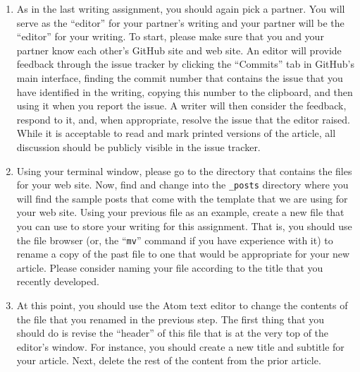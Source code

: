 \begin{enumerate}

  \itemsep 0em

  \item As in the last writing assignment, you should again pick a partner. You will serve as the ``editor'' for your
    partner's writing and your partner will be the ``editor'' for your writing. To start, please make sure that you and
    your partner know each other's GitHub site and web site. An editor will provide feedback through the issue tracker
    by clicking the ``Commits'' tab in GitHub's main interface, finding the commit number that contains the issue that
    you have identified in the writing, copying this number to the clipboard, and then using it when you report the
    issue. A writer will then consider the feedback, respond to it, and, when appropriate, resolve the issue that the
    editor raised. While it is acceptable to read and mark printed versions of the article, all discussion should be
    publicly visible in the issue tracker.

  \item Using your terminal window, please go to the directory that contains the files for your web site. Now, find and
    change into the {\tt \_posts} directory where you will find the sample posts that come with the template that we are
    using for your web site. Using your previous file as an example, create a new file that you can use to store your
    writing for this assignment. That is, you should use the file browser (or, the ``{\tt mv}'' command if you have
    experience with it) to rename a copy of the past file to one that would be appropriate for your new article. Please
    consider naming your file according to the title that you recently developed.

  \item At this point, you should use the Atom text editor to change the contents of the file that you renamed in the
    previous step. The first thing that you should do is revise the ``header'' of this file that is at the very top of
    the editor's window. For instance, you should create a new title and subtitle for your article. Next, delete the
    rest of the content from the prior article.


\end{enumerate}
